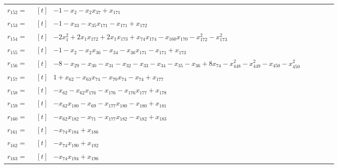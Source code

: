 \begin{longtable}{@{}r p{0.92\linewidth}@{}}
$r_{152}=$ & $\begin{aligned}[t]&-1-x_{2}-x_{2}x_{37}+x_{171}\end{aligned}$ \\[2pt]
$r_{153}=$ & $\begin{aligned}[t]&-1-x_{33}-x_{35}x_{171}-x_{171}+x_{172}\end{aligned}$ \\[2pt]
$r_{154}=$ & $\begin{aligned}[t]&-2x_{1}^{2}+2x_{1}x_{172}+2x_{1}x_{173}+x_{74}x_{174}-x_{160}x_{170}-x_{172}^{2}-x_{173}^{2}\end{aligned}$ \\[2pt]
$r_{155}=$ & $\begin{aligned}[t]&-1-x_{2}-x_{2}x_{36}-x_{34}-x_{36}x_{171}-x_{171}+x_{173}\end{aligned}$ \\[2pt]
$r_{156}=$ & $\begin{aligned}[t]&-8-x_{29}-x_{30}-x_{31}-x_{32}-x_{33}-x_{34}-x_{35}-x_{36}+8x_{74}-x_{448}^{2}-x_{449}^{2}-x_{450}-x_{450}^{2}\end{aligned}$ \\[2pt]
$r_{157}=$ & $\begin{aligned}[t]&1+x_{62}-x_{63}x_{74}-x_{70}x_{74}-x_{74}+x_{177}\end{aligned}$ \\[2pt]
$r_{158}=$ & $\begin{aligned}[t]&-x_{62}-x_{62}x_{176}-x_{176}-x_{176}x_{177}+x_{178}\end{aligned}$ \\[2pt]
$r_{159}=$ & $\begin{aligned}[t]&-x_{62}x_{180}-x_{69}-x_{177}x_{180}-x_{180}+x_{181}\end{aligned}$ \\[2pt]
$r_{160}=$ & $\begin{aligned}[t]&-x_{62}x_{182}-x_{71}-x_{177}x_{182}-x_{182}+x_{183}\end{aligned}$ \\[2pt]
$r_{161}=$ & $\begin{aligned}[t]&-x_{74}x_{184}+x_{186}\end{aligned}$ \\[2pt]
$r_{162}=$ & $\begin{aligned}[t]&-x_{74}x_{190}+x_{192}\end{aligned}$ \\[2pt]
$r_{163}=$ & $\begin{aligned}[t]&-x_{74}x_{194}+x_{196}\end{aligned}$ \\[2pt]

\end{longtable}
